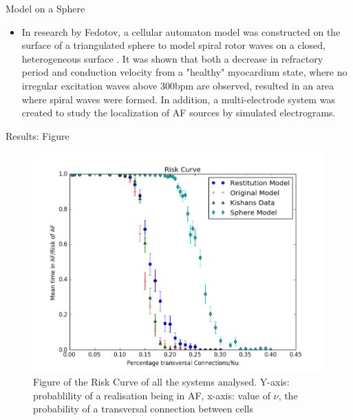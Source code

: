 \documentclass[final,hyperref={pdfpagelabels=false}]{beamer}
\begin{document}
\begin{frame}[t]
\begin{columns}[t]
\begin{column}{.465\textwidth}
\begin{block}{Model on a Sphere}
\begin{itemize}
\item In research by Fedotov, a cellular automaton model was constructed on the surface of a triangulated sphere to model spiral rotor waves on a closed, heterogeneous surface \cite{Fedotov}. It was shown that both a decrease in refractory period and conduction velocity from a "healthy" myocardium state, where no irregular excitation waves above 300bpm are observed, resulted in an area where spiral waves were formed. In addition, a multi-electrode system was created to study the localization of AF sources by simulated electrograms. 
\end{itemize}

\end{block}

\begin{block}{Results: Figure}

\begin{figure}
\includegraphics[width=0.8\linewidth]{xriskcurvesphere}
\caption{Figure of the Risk Curve of all the systems analysed. Y-axis: probablility of a realisation being in AF, x-axis: value of $\nu$, the  probability of a transversal connection between cells}
\end{figure}

\end{block}



\end{column}
\end{columns}
\end{frame}
\end{document}
